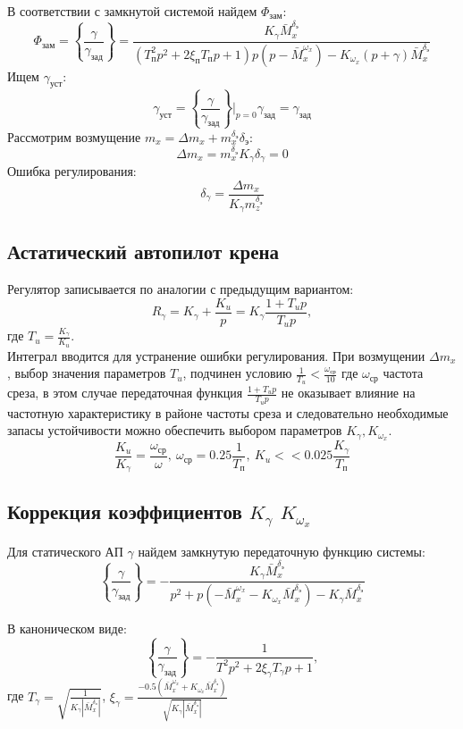\documentclass{article}
\begin{document}
В соответствии с замкнутой системой найдем $\Phi_\text{зам}$:
\[
	\Phi_\text{зам} =\left\{\frac{\gamma}{\gamma_\text{зад}}\right\} =
	\frac{K_\gamma \bar{M}_x^{\delta_\text{э}}}{(T_\text{п}^2 p^2 + 2
	\xi_\text{п} T_\text{п} p + 1)p(p - \bar{M}_x^{\omega_x}) - K_{\omega_x}(p
	+ \gamma)\bar{M}_x^{\delta_\text{э}}}
\]
Ищем $\gamma_\text{уст}$:
\[ \gamma_\text{уст} = \left\{\frac{\gamma}{\gamma_\text{зад}}\right\}\Big|_{p
	= 0} \gamma_\text{зад} = \gamma_\text{зад} \]
Рассмотрим возмущение $m_x = \Delta m_x + m_x^{\delta_\text{э}}
	\delta_\text{э}$:
\[
	\Delta m_x = m_x^{\delta_\text{э}} K_\gamma \delta_\gamma = 0
\]
Ошибка регулирования:
\[
	\delta_\gamma =\frac{\Delta m_x}{K_\gamma m_z^{\delta_\text{э}}}
\]

\subsection{Астатический автопилот крена}
Регулятор записывается по аналогии с предыдущим вариантом:
\[
	R_\gamma = K_\gamma +\frac{K_u}{p}  = K_\gamma\frac{1 + T_u p}{T_u p},
\]
где $T_u  = \frac{K_\gamma}{K_u}$.\\
Интеграл вводится для устранение ошибки регулирования. При возмущении $\Delta
	m_x$, выбор значения параметров $T_u$, подчинен условию $\frac{1}{T_u} <
	\frac{\omega_\text{ср}}{10}$ где $\omega_\text{ср}$ частота среза, в этом
случае передаточная функция $\frac{1 + T_u p}{T_u p}$ не оказывает влияние на
частотную характеристику в районе частоты среза и следовательно необходимые
запасы устойчивости можно обеспечить выбором параметров $K_\gamma,
	K_{\omega_x}$.
\[
	\frac{K_u}{K_\gamma} =\frac{\omega_\text{ср}}{\omega}, \ \omega_\text{ср} =
	0.25\frac{1}{T_\text{п}}, \ K_u << 0.025\frac{K_\gamma}{T_\text{п}}
\]
\subsection{Коррекция коэффициентов \texorpdfstring{$K_\gamma$}{Lg}
	\texorpdfstring{$K_{\omega_x}$}{Lg}}
Для статического АП $\gamma$ найдем замкнутую передаточную функцию системы:
\[
	\left\{\frac{\gamma}{\gamma_\text{зад}}\right\} = -\frac{K_\gamma
	\bar{M}_x^{\delta_\text{э}}}{p^2 + p(-\bar{M}_x^{\omega_x} - K_{\omega_x}
	\bar{M}_x^{\delta_\text{э}}) - K_{\gamma} \bar{M}_x^{\delta_\text{э}}}
\]

В каноническом виде:
\[
	\left\{\frac{\gamma}{\gamma_\text{зад}}\right\} = -\frac{1}{T^2 p^2 +
		2\xi_{\gamma} T_{\gamma} p + 1},
\]
где $T_\gamma = \sqrt{\frac{1}{K_\gamma |\bar{M}_x^{\delta_\text{э}}|}}$,
$\xi_{\gamma} = \frac{-0.5(\bar{M}_x^{\omega_x} + K_{\omega_x}
	\bar{M}_x^{\delta_\text{э}})}{\sqrt{K_\gamma |\bar{M}_x^{\delta_\text{э}}|}}$
\end{document}
